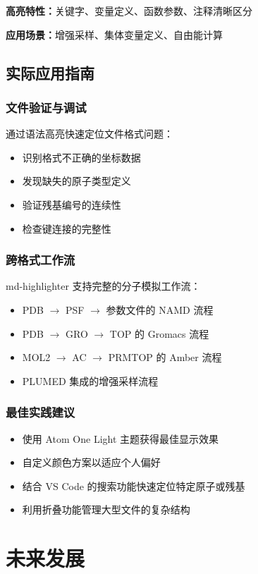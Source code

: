 \textbf{高亮特性：}关键字、变量定义、函数参数、注释清晰区分

\textbf{应用场景：}增强采样、集体变量定义、自由能计算

\subsection{实际应用指南}

\subsubsection{文件验证与调试}
通过语法高亮快速定位文件格式问题：
\begin{itemize}
    \item 识别格式不正确的坐标数据
    \item 发现缺失的原子类型定义
    \item 验证残基编号的连续性
    \item 检查键连接的完整性
\end{itemize}

\subsubsection{跨格式工作流}
md-highlighter 支持完整的分子模拟工作流：
\begin{itemize}
    \item PDB $\to$ PSF $\to$ 参数文件的 NAMD 流程
    \item PDB $\to$ GRO $\to$ TOP 的 Gromacs 流程  
    \item MOL2 $\to$ AC $\to$ PRMTOP 的 Amber 流程
    \item PLUMED 集成的增强采样流程
\end{itemize}

\subsubsection{最佳实践建议}
\begin{itemize}
    \item 使用 Atom One Light 主题获得最佳显示效果
    \item 自定义颜色方案以适应个人偏好
    \item 结合 VS Code 的搜索功能快速定位特定原子或残基
    \item 利用折叠功能管理大型文件的复杂结构
\end{itemize}

\section{未来发展}

